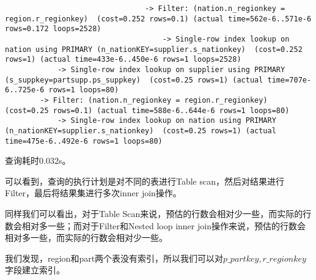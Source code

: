 \documentclass{article}
\begin{document}
\begin{lstlisting}
                                -> Filter: (nation.n_regionkey = region.r_regionkey)  (cost=0.252 rows=0.1) (actual time=562e-6..571e-6 rows=0.172 loops=2528)
                                    -> Single-row index lookup on nation using PRIMARY (n_nationKEY=supplier.s_nationkey)  (cost=0.252 rows=1) (actual time=433e-6..450e-6 rows=1 loops=2528)
            -> Single-row index lookup on supplier using PRIMARY (s_suppkey=partsupp.ps_suppkey)  (cost=0.25 rows=1) (actual time=707e-6..725e-6 rows=1 loops=80)
        -> Filter: (nation.n_regionkey = region.r_regionkey)  (cost=0.25 rows=0.1) (actual time=588e-6..644e-6 rows=1 loops=80)
            -> Single-row index lookup on nation using PRIMARY (n_nationKEY=supplier.s_nationkey)  (cost=0.25 rows=1) (actual time=475e-6..492e-6 rows=1 loops=80)

\end{lstlisting}

查询耗时0.032s。

可以看到，查询的执行计划是对不同的表进行Table scan，然后对结果进行Filter，最后将结果集进行多次inner join操作。

同样我们可以看出，对于Table Scan来说，预估的行数会相对少一些，而实际的行数会相对多一些；而对于Filter和Nested loop inner join操作来说，预估的行数会相对多一些，而实际的行数会相对少一些。

我们发现，region和part两个表没有索引，所以我们可以对$p\_partkey,r\_regionkey$字段建立索引。
\end{document}

